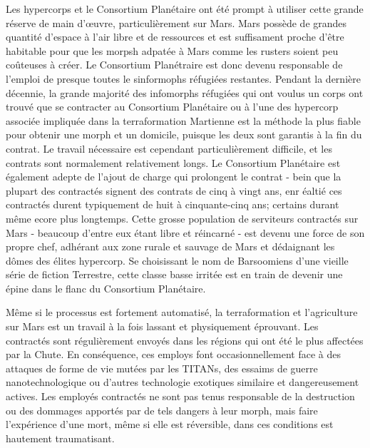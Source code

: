                Les hypercorps et le Consortium Planétaire ont été prompt à utiliser cette grande réserve de main d'œuvre, particulièrement sur Mars. Mars possède de grandes quantité d'espace à l'air libre et de ressources et est suffisament proche d'être habitable pour que les morpsh adpatée à Mars comme les rusters soient peu coûteuses à créer. Le Consortium Planétraire est donc devenu responsable de l'emploi de presque toutes le sinformophs réfugiées restantes. Pendant la dernière décennie, la grande majorité des infomorphs réfugiées qui ont voulus un corps ont trouvé que se contracter au Consortium Planétaire ou à l'une des hypercorp associée impliquée dans la terraformation Martienne  est la méthode la plus fiable pour obtenir une morph et un domicile, puisque les deux sont garantis à la fin du contrat. Le travail nécessaire est cependant particulièrement difficile, et les contrats sont normalement relativement longs. Le Consortium Planétaire est également adepte de l'ajout de charge qui prolongent le contrat - bein que la plupart des contractés signent des contrats de cinq à vingt ans, enr éaltié ces contractés durent typiquement de huit à cinquante-cinq ans; certains durant même ecore plus longtemps. Cette grosse population de serviteurs contractés sur Mars - beaucoup d'entre eux étant libre et réincarné - est devenu une force de son propre chef, adhérant aux zone rurale et sauvage de Mars et dédaignant les dômes des élites hypercorp. Se choisissant le nom de Barsoomiens d'une vieille série de fiction Terrestre, cette classe basse irritée est en train de devenir une épine dans le flanc du Consortium Planétaire. 

               Même si le processus est fortement automatisé, la terraformation et l'agriculture sur Mars est un travail à la fois lassant et physiquement éprouvant. Les contractés sont régulièrement envoyés dans les régions qui ont été le plus affectées par la Chute. En conséquence, ces employs font occasionnellement face à des attaques de forme de vie mutées par les TITANs, des essaims de guerre nanotechnologique ou d'autres technologie exotiques similaire et dangereusement actives. Les employés contractés ne sont pas tenus responsable de la destruction ou des dommages apportés par de tels dangers à leur morph, mais faire l'expérience d'une mort, même si elle est réversible, dans ces conditions est hautement traumatisant. 

